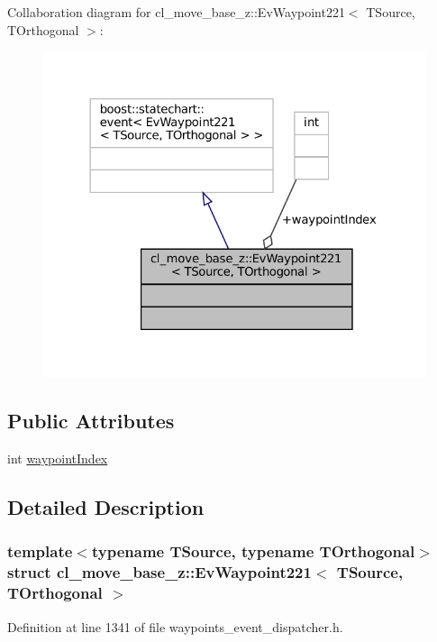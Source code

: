 Collaboration diagram for cl\+\_\+move\+\_\+base\+\_\+z\+:\+:Ev\+Waypoint221$<$ T\+Source, T\+Orthogonal $>$\+:
\nopagebreak
\begin{figure}[H]
\begin{center}
\leavevmode
\includegraphics[width=324pt]{structcl__move__base__z_1_1EvWaypoint221__coll__graph}
\end{center}
\end{figure}
\subsection*{Public Attributes}
\begin{DoxyCompactItemize}
\item 
int \hyperlink{structcl__move__base__z_1_1EvWaypoint221_a9a0a9734a1c1fd1e2681e20e0eda4242}{waypoint\+Index}
\end{DoxyCompactItemize}


\subsection{Detailed Description}
\subsubsection*{template$<$typename T\+Source, typename T\+Orthogonal$>$\newline
struct cl\+\_\+move\+\_\+base\+\_\+z\+::\+Ev\+Waypoint221$<$ T\+Source, T\+Orthogonal $>$}



Definition at line 1341 of file waypoints\+\_\+event\+\_\+dispatcher.\+h.



